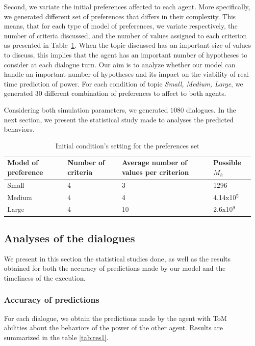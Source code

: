 \documentclass[conference, letterpaper]{IEEEtran}
\begin{document}
	Second, we variate the initial preferences affected to each agent. More specifically, we generated different set of preferences that differs in their complexity. This means, that for each type of model of preferences, we variate respectively, the number of criteria discussed, and the number of values assigned to each criterion as presented in Table~\ref{tab:initP}. When the topic discussed has an important size of values to discuss, this implies that the agent has an important  number of hypotheses to consider at each dialogue turn. Our aim is to analyze whether our model can handle an important number of hypotheses and its impact on the viability of real time prediction of power. 	
	For each condition of topic \emph{Small, Medium, Large}, we generated $30$ different combination of preferences to affect to both agents.
	
	Considering both simulation parameters, we generated $1080$ dialogues. In the next section, we present the statistical study made to analyses the predicted behaviors.
	
	\begin{table}[]
		\caption{Initial condition's setting for the preferences set} 
		\centering
		\begin{tabular}{|p{1.75cm}|p{1.5cm}|p{1.75cm}|p{1.5cm}|}
			\hline 
			\textbf{Model of preference } & Number of criteria & Average number of values per criterion & Possible $M_h$\\
			\hline
			Small & 4 & 3 & 1296 \\
			\hline
			Medium & 4 & 4 & 4.14x10$^5$ \\
			\hline
			Large & 4 & 10 & 2.6x10$^9$ \\
			\hline
		\end{tabular}
		
		\label{tab:initP}
	\end{table}
	
	\subsection{Analyses of the dialogues}
	We present in this section the statistical studies done, as well as the results obtained for both the accuracy of predictions made by our model and the timeliness of the execution.
	
	\subsubsection{Accuracy of predictions} For each dialogue, we obtain the predictions made by the agent with ToM abilities about the behaviors of the power of the other agent. Results are summarized in the table \ref{tab:res1}. 
	
\end{document}
